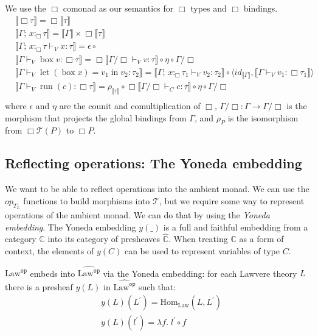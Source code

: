 \documentclass[acmsmall, screen, nonacm]{acmart}
\theoremstyle{definition}
\newcommand{\glob}{\mathop{\Box}}
\newcommand{\cat}{\mathbb{C}}
\newcommand{\catobj}{C}
\newcommand{\psh}{\widehat{\cat}}
\newcommand{\lawc}{\mathrm{Law}}
\newcommand{\lawcop}{\lawc^{\mathtt{op}}}
\newcommand{\pshlawcop}{\widehat{\lawcop}}
\newcommand{\yoneda}[1]{y(#1)}
\newcommand{\homset}[3]{\mathrm{Hom}_{#1}(#2, #3)}
\newcommand{\sem}[1]{\llbracket #1 \rrbracket}
\newcommand{\mon}{\mathcal{T}}
\newcommand{\snd}{\mathop{\pi_2}}
\newcommand{\types}{\mathrel{:}}
\newcommand{\gtypes}{\mathrel{:_{\Box}}}
\newcommand{\ccons}[2]{#1;\,#2}
\newcommand{\gbind}[3]{\ccons{#1}{#2\gtypes#3}}
\newcommand{\cdiv}[1]{#1/\Box}
\newcommand{\gbox}[1]{\mathop{\mathrm{box}} #1}
\newcommand{\gunbox}[3]{\mathop{\mathrm{let}} (\gbox #1) = #2 \mathop{\mathrm{in}} #3}
\newcommand{\grun}[1]{\mathop{\mathrm{run}}(#1)}
\newcommand{\turnv}{\mathrel{\vdash_V}}
\newcommand{\turnc}{\mathrel{\vdash_C}}
\begin{document}
We use the $\glob$ comonad as our semantics for $\glob$ types and
$\glob$ bindings.
\begin{align*}
&\sem{\glob \tau} = \glob \sem{\tau} \\
&\sem{\gbind{\Gamma}{x}{\tau}} = \sem{\Gamma} \times \glob \sem{\tau} \\
&\sem{\gbind{\Gamma}{x}{\tau} \turnv x \types \tau} = \epsilon \circ \snd \\
&\sem{\Gamma \turnv \gbox{v} \types \glob \tau} =
  \glob \sem{\cdiv{\Gamma} \turnv v \types \tau}
  \circ \eta \circ \cdiv{\Gamma} \\
&\sem{\Gamma \turnv \gunbox{x}{v_1}{v_2} \types \tau_2} =
  \sem{\gbind{\Gamma}{x}{\tau_1} \turnv v_2 \types \tau_2}
  \circ \langle id_{\sem{\Gamma}},
                \sem{\Gamma \turnv v_1 \types \glob \tau_1} \rangle \\
&\sem{\Gamma \turnv \grun{c} \types \glob \tau} =
  \rho_{\sem{\tau}}
  \circ \glob \sem{\cdiv{\Gamma} \turnc c \types \tau}
  \circ \eta \circ \cdiv{\Gamma}\\
\end{align*}
where $\epsilon$ and $\eta$ are the counit and comultiplication of
$\glob$, $\cdiv{\Gamma} \types \Gamma \rightarrow \cdiv{\Gamma}$ is the
morphism that projects the global bindings from $\Gamma$, and $\rho_P$
is the isomorphism from $\glob \mon(P)$ to $\glob P$.

\subsection{Reflecting operations: The Yoneda embedding}

We want to be able to reflect operations into the ambient monad. We can
use the $op_{T_L}$ functions to build morphisms into $\mon$, but we
require some way to represent operations of the ambient monad. We can do
that by using the \emph{Yoneda embedding}. The Yoneda embedding
$\yoneda{\_}$ is a full and faithful embedding from a category $\cat$
into its category of presheaves $\psh$. When treating $\cat$ as a form
of context, the elements of $y(\catobj)$ can be used to represent
variables of type $\catobj$.

$\lawcop$ embeds into $\pshlawcop$ via the Yoneda embedding: for each
Lawvere theory $L$ there is a presheaf $\yoneda{L}$ in $\pshlawcop$ such
that:
\begin{align*}
&\yoneda{L}(L^{\prime}) = \homset{\lawc}{L}{L^{\prime}} \\
&\yoneda{L}(l^{\prime}) = \lambda f.\; l^{\prime} \circ f
\end{align*}
\end{document}

